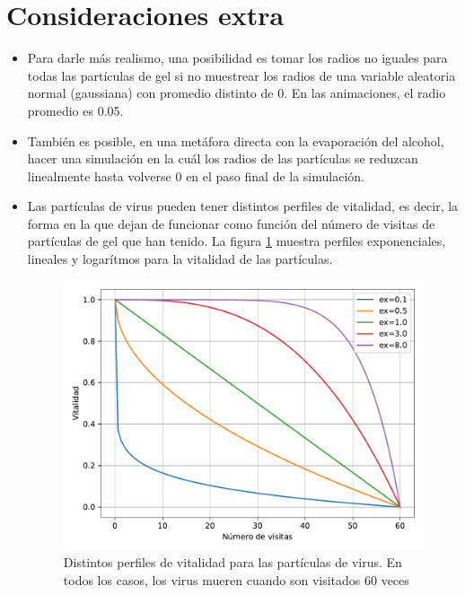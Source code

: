 \documentclass[11pt]{article}
\begin{document}
\section{Consideraciones extra}
\begin{itemize}
    \item Para darle más realismo, una posibilidad es tomar los radios no iguales para todas las partículas de gel si no muestrear los radios de una variable aleatoria normal (gaussiana) con promedio distinto de 0. En las animaciones, el radio promedio es 0.05. 
    \item También es posible, en una metáfora directa con la evaporación del alcohol, hacer una simulación en la cuál los radios de las partículas se reduzcan linealmente hasta volverse 0 en el paso final de la simulación.
    \item Las partículas de virus pueden tener distintos perfiles de vitalidad, es decir, la forma en la que dejan de funcionar como función del número de visitas de partículas de gel que han tenido. La figura \ref{fig:vitalidad} muestra perfiles exponenciales, lineales y logarítmos para la vitalidad de las partículas.
    \begin{figure}[h]
        \centering
        \includegraphics[width=\textwidth]{vitalidad.pdf}
        \caption{Distintos perfiles de vitalidad para las partículas de virus. En todos los casos, los virus mueren cuando son visitados 60 veces}
        \label{fig:vitalidad}
    \end{figure}
\end{itemize}
\end{document}
